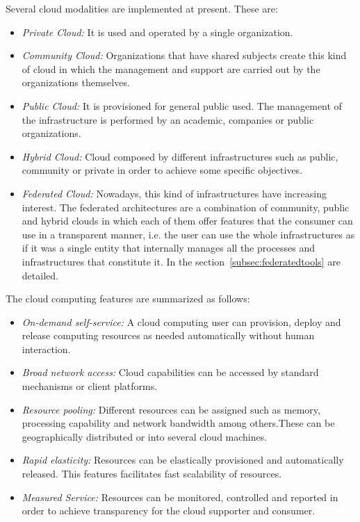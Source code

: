 Several cloud modalities are implemented at present. These are:
\begin{itemize}
\item \emph{Private Cloud:} It is used and operated by a single organization.
\item \emph{Community Cloud:} Organizations that have shared subjects create
  this kind of cloud in which the management and support are carried out by the
  organizations themselves.
\item \emph{Public Cloud:} It is provisioned for  general public used. The
  management of the infrastructure is performed by an academic, companies or
  public organizations.
\item \emph{Hybrid Cloud:} Cloud composed by different infrastructures such as
  public,   community or private in order to achieve some specific objectives.
\item \emph{Federated Cloud:} Nowadays, this kind of infrastructures have
  increasing interest. The federated architectures are a combination of community, public
  and hybrid clouds in which each of them offer features that the consumer can
  use in a transparent manner, i.e. the user can use the whole infrastructures
  as if it was a single entity that internally manages all the processes and
  infrastructures that constitute it. In the section~\ref{subsec:federatedtools} are detailed.
\end{itemize}

The  cloud computing features are summarized as follows:
\begin{itemize}
\item \emph{On-demand self-service:} A cloud computing user can provision,
  deploy and release computing resources as needed automatically without human
  interaction.
\item \emph{Broad network access:} Cloud capabilities can be accessed by
  standard mechanisms or client platforms.
\item \emph{Resource pooling:} Different resources can be assigned such as memory,
  processing capability and network bandwidth among others.These can be
  geographically distributed or into several cloud machines.
\item \emph{Rapid elasticity:} Resources can be elastically provisioned and
  automatically released. This features facilitates fast scalability of resources.
\item \emph{Measured Service:} Resources can be monitored, controlled and
  reported in order to achieve transparency for the cloud supporter and consumer.
\end{itemize}

